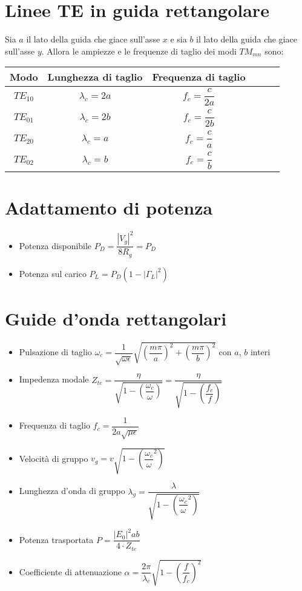 \documentclass{article}
\begin{document}
\section{Linee TE in guida rettangolare}
Sia \(a\) il lato della guida che giace sull'asse \(x\) e sia \(b\) il lato della guida che giace sull'asse \(y\). Allora le ampiezze e le frequenze di taglio dei modi \(TM_{mn} \) sono:
\vspace{15pt}
\begin{center}
	\begin{tabular}{|Sc|Sc|Sc|}
		\hline 
		Modo & Lunghezza di taglio & Frequenza di taglio \\ 
		\hline 	
		\(TE_{10}\) & \(\lambda_c = 2a\) & \(f_c = \dfrac{c}{2a}\) \\ 
		\hline 
		\(TE_{01}\) & \(\lambda_c = 2b\) & \(f_c = \dfrac{c}{2b}\) \\ 
		\hline 
		\(TE_{20}\) & \(\lambda_c = a\) & \(f_c = \dfrac{c}{a}\) \\ 
		\hline 
		\(TE_{02}\) & \(\lambda_c = b\) & \(f_c = \dfrac{c}{b}\) \\ 
		\hline 
	\end{tabular} 
\end{center}
\vspace{5pt}

\section{Adattamento di potenza}
\begin{itemize}
	\item Potenza disponibile \( P_D = \dfrac{|V_g|^2}{8 R_g} = P_D \)
	\item Potenza sul carico \( P_L = P_D ( 1 - | \Gamma_L | ^ 2 ) \)   
\end{itemize}

\section{Guide d'onda rettangolari}
\begin{itemize}
	\item Pulsazione di taglio \( \omega_c = \dfrac{1}{\sqrt{\omega \epsilon}} \sqrt{\left( \dfrac{m \pi}{a}\right)^2 + \left( \dfrac{m \pi}{b} \right)^2 }\) con \(a\), \(b\) interi
	\item Impedenza modale \( Z_{te} = \dfrac{\eta}{\sqrt{1-\left(\dfrac{\omega_c}{\omega} \right) }} = \dfrac{\eta}{\sqrt{1-\left(\dfrac{f_c}{f} \right) }} \)
	\item Frequenza di taglio \( f_c = \dfrac{1}{2a \sqrt{\mu \epsilon}} \)
	\item Velocità di gruppo \( v_g = v \sqrt{1- \left( \dfrac{\omega_c}{\omega} ^ 2 \right)} \)
	\item Lunghezza d'onda di gruppo \( \lambda_g = \dfrac{\lambda}{\sqrt{1- \left( \dfrac{\omega_c}{\omega} ^ 2 \right)}}\)
	\item Potenza trasportata \( P = \dfrac{|E_0|^2 a b}{4 \cdot Z_{te}} \)
	\item Coefficiente di attenuazione \( \alpha = \dfrac{2 \pi}{\lambda_c} \sqrt{1 - \left( \dfrac{f}{f_c} \right) ^ 2} \)
\end{itemize}
\end{document}

